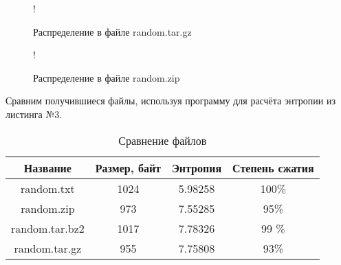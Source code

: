 \begin{figure}[H]
    \caption{Распределение в файле random.tar.gz}
    \label{fig:3}
    \centering
    \resizebox {.8\textwidth} {!} {

    }
\end{figure}

\begin{figure}[H]
    \caption{Распределение в файле random.zip}
    \label{fig:4}
    \centering
    \resizebox {.8\textwidth} {!} {

    }
\end{figure}

Сравним получившиеся файлы, используя программу для расчёта энтропии из листинга №3.

\begin{table}[!h]
    \caption{Сравнение файлов}
    \label{tbl:1}
    \centering

    \begin{tabular}{|c|c|c|c|}
        \hline
        Название & Размер, байт & Энтропия & Степень сжатия \\ \hline
        random.txt & 1024 & 5.98258 & 100\% \\ \hline
        random.zip & 973 & 7.55285 & 95\% \\ \hline
        random.tar.bz2 & 1017 & 7.78326 & 99 \% \\ \hline
        random.tar.gz & 955 & 7.75808 & 93\% \\ \hline

    \end{tabular}
\end{table}


